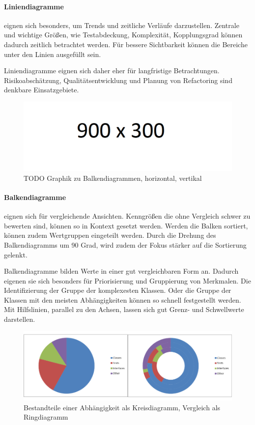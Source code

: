 \paragraph{Liniendiagramme} eignen sich besonders, um Trends und zeitliche Verläufe darzustellen. Zentrale und wichtige Größen, wie Testabdeckung, Komplexität, Kopplungsgrad können dadurch zeitlich betrachtet werden. Für bessere Sichtbarkeit können die Bereiche unter den Linien ausgefüllt sein.

Liniendiagramme eignen sich daher eher für langfristige Betrachtungen. Risikoabschätzung, Qualitätsentwicklung und Planung von Refactoring sind denkbare Einsatzgebiete.

\begin{figure}[htbp]
  \includegraphics[width=\textwidth, height=\textheight, keepaspectratio]
    {resources/900x300.pdf}
  \caption{TODO Graphik zu Balkendiagrammen, horizontal, vertikal}
  \label{bar-chart}
\end{figure}
\paragraph{Balkendiagramme} eignen sich für vergleichende Ansichten. Kenngrößen die ohne Vergleich schwer zu bewerten sind, können so in Kontext gesetzt werden. Werden die Balken sortiert, können zudem Wertgruppen eingeteilt werden. Durch die Drehung des Balkendiagramms um 90 Grad, wird zudem der Fokus stärker auf die Sortierung gelenkt.

Balkendiagramme bilden Werte in einer gut vergleichbaren Form an. Dadurch eigenen sie sich besonders für Priorisierung und Gruppierung von Merkmalen.
Die Identifizierung der Gruppe der komplexesten Klassen. Oder die Gruppe der Klassen mit den meisten Abhängigkeiten können so schnell festgestellt werden. Mit Hilfslinien, parallel zu den Achsen, lassen sich gut Grenz- und Schwellwerte darstellen.

\begin{figure}[htbp]
  \includegraphics[width=\textwidth, height=\textheight, keepaspectratio]
    {resources/circle-graph.pdf}
  \caption{Bestandteile einer Abhängigkeit als Kreisdiagramm, Vergleich als Ringdiagramm}
  \label{circle-chart}
\end{figure}
